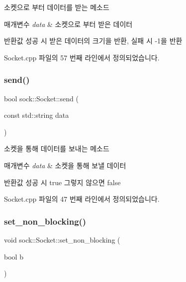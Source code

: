 소켓으로 부터 데이터를 받는 메소드 


\begin{DoxyParams}{매개변수}
{\em data} & 소켓으로 부터 받은 데이터 \\
\hline
\end{DoxyParams}
\begin{DoxyReturn}{반환값}
성공 시 받은 데이터의 크기을 반환, 실패 시 -\/1을 반환 
\end{DoxyReturn}


Socket.\+cpp 파일의 57 번째 라인에서 정의되었습니다.

\mbox{\label{classsock_1_1_socket_a1d980395d1e06e4b9e1c5c65a2220a0a}} 
\subsubsection{\texorpdfstring{send()}{send()}}
{\footnotesize\ttfamily bool sock\+::\+Socket\+::send (\begin{DoxyParamCaption}\item[{const std\+::string}]{data }\end{DoxyParamCaption})}



소켓을 통해 데이터를 보내는 메소드 


\begin{DoxyParams}{매개변수}
{\em data} & 소켓을 통해 보낼 데이터 \\
\hline
\end{DoxyParams}
\begin{DoxyReturn}{반환값}
성공 시 true 그렇지 않으면 false 
\end{DoxyReturn}


Socket.\+cpp 파일의 47 번째 라인에서 정의되었습니다.

\mbox{\label{classsock_1_1_socket_a908007148692a4a8dfa6a339b679b8a8}} 
\subsubsection{\texorpdfstring{set\+\_\+non\+\_\+blocking()}{set\_non\_blocking()}}
{\footnotesize\ttfamily void sock\+::\+Socket\+::set\+\_\+non\+\_\+blocking (\begin{DoxyParamCaption}\item[{bool}]{b }\end{DoxyParamCaption})}



